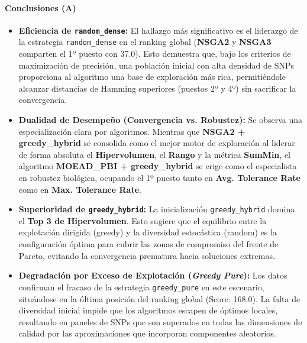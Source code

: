 \documentclass[a4paper,10pt]{article} %
\begin{document}
\paragraph{Conclusiones (A)}
\begin{itemize}
    \item \textbf{Eficiencia de \texttt{random\_dense}:} El hallazgo más significativo es el liderazgo de la estrategia \texttt{random\_dense} en el ranking global (\textbf{NSGA2} y \textbf{NSGA3} comparten el 1º puesto con 37.0). Esto demuestra que, bajo los criterios de maximización de precisión, una población inicial con alta densidad de SNPs proporciona al algoritmo una base de exploración más rica, permitiéndole alcanzar distancias de Hamming superiores (puestos 2º y 4º) sin sacrificar la convergencia.
    
    \item \textbf{Dualidad de Desempeño (Convergencia vs. Robustez):} Se observa una especialización clara por algoritmos. Mientras que \textbf{NSGA2 + greedy\_hybrid} se consolida como el mejor motor de exploración al liderar de forma absoluta el \textbf{Hipervolumen}, el \textbf{Rango} y la métrica \textbf{SumMin}, el algoritmo \textbf{MOEAD\_PBI + greedy\_hybrid} se erige como el especialista en robustez biológica, ocupando el 1º puesto tanto en \textbf{Avg. Tolerance Rate} como en \textbf{Max. Tolerance Rate}.
    
    \item \textbf{Superioridad de \texttt{greedy\_hybrid}:} La inicialización \texttt{greedy\_hybrid} domina el \textbf{Top 3 de Hipervolumen}. Esto sugiere que el equilibrio entre la explotación dirigida (greedy) y la diversidad estocástica (random) es la configuración óptima para cubrir las zonas de compromiso del frente de Pareto, evitando la convergencia prematura hacia soluciones extremas.
    
    \item \textbf{Degradación por Exceso de Explotación (\textit{Greedy Pure}):} Los datos confirman el fracaso de la estrategia \texttt{greedy\_pure} en este escenario, situándose en la última posición del ranking global (Score: 168.0). La falta de diversidad inicial impide que los algoritmos escapen de óptimos locales, resultando en paneles de SNPs que son superados en todas las dimensiones de calidad por las aproximaciones que incorporan componentes aleatorios.

\end{itemize}


\end{document}
